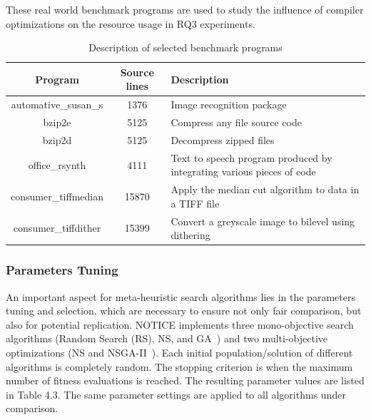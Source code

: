 These real world benchmark programs are used to study the influence of compiler optimizations on the resource usage in RQ3 experiments.
 
\begin{table}[h]
	\begin{center}
		\begin{tabular}{|c|c|p{5cm}|}
			\hline
			\textbf{Program} & \textbf{Source lines} & \textbf{Description}\\
			\hline
			automative\_susan\_s & 1376 & Image recognition package\\
			\hline
			bzip2e & 5125 & Compress any file
			source code \\
			\hline
			bzip2d & 5125 & Decompress zipped files \\
			\hline
			office\_rsynth & 4111 & Text to speech program produced by integrating various pieces of code\\
			\hline
			consumer\_tiffmedian& 15870 & Apply the median cut algorithm to data in a TIFF file
			\\
			
			\hline
			consumer\_tiffdither& 15399 & Convert a greyscale image to bilevel using dithering
			\\
			\hline
			
		\end{tabular}
		
	\end{center}
	\caption {Description of selected benchmark programs}
\end{table}


\subsubsection{Parameters Tuning}
An important aspect for meta-heuristic search algorithms lies in the parameters tuning and selection, which are necessary to ensure not only fair comparison, but also for potential replication.
NOTICE implements three mono-objective search algorithms (Random Search (RS), NS, and GA~\cite{cooper2002adaptive}) and two multi-objective optimizations (NS and NSGA-II~\cite{deb2002fast}). Each initial population/solution of different algorithms is completely random. The stopping criterion is when the maximum number of fitness evaluations is reached.
The resulting parameter values are listed in Table 4.3. The same parameter settings are applied to all algorithms under comparison.


